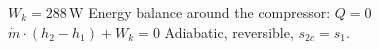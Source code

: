 \( W_k = 288 \, \text{W} \)  
Energy balance around the compressor:  
\( Q = 0 \)  
\( \dot{m} \cdot (h_2 - h_1) + W_k = 0 \)  
Adiabatic, reversible, \( s_{2c} = s_1 \).